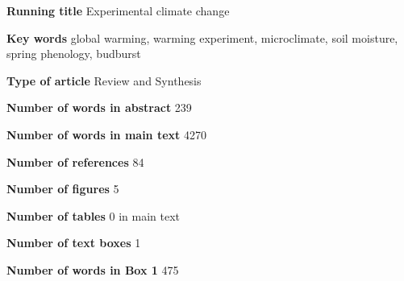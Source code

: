 \documentclass{article}
\begin{document}
\textbf{Running title} Experimental climate change

\textbf{Key words} global warming, warming experiment, microclimate, soil moisture, spring phenology, budburst

\textbf{Type of article} Review and Synthesis

\textbf{Number of words in abstract} 239

\textbf{Number of words in main text} 4270%

\textbf{Number of references} 84

\textbf{Number of figures} 5

\textbf{Number of tables} 0 in main text

\textbf{Number of text boxes} 1

\textbf{Number of words in Box 1} 475

\clearpage

\linenumbers
\end{document}
